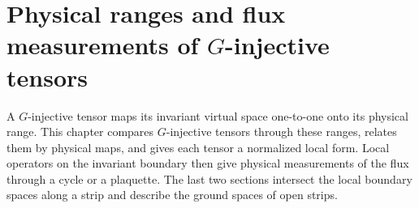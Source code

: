 
\chapter{Physical ranges and flux measurements of \texorpdfstring{$G$}{G}-injective tensors}%
\label{ch:peps_g_injective_ranges}

A $G$-injective tensor maps its invariant virtual space one-to-one onto its
physical range. This chapter compares $G$-injective tensors through these
ranges, relates them by physical maps, and gives each tensor a normalized
local form. Local operators on the invariant boundary
then give physical measurements of the flux through a cycle or a plaquette.
The last two sections intersect the local boundary spaces along a strip and
describe the ground spaces of open strips.




















